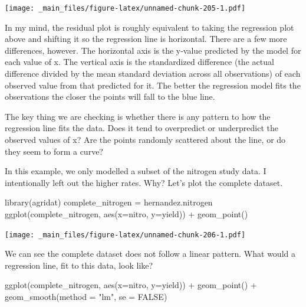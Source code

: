 \documentclass[
]{book}
\newenvironment{Shaded}{\begin{snugshade}}{\end{snugshade}}
\newcommand{\AttributeTok}[1]{\textcolor[rgb]{0.77,0.63,0.00}{#1}}
\newcommand{\ConstantTok}[1]{\textcolor[rgb]{0.00,0.00,0.00}{#1}}
\newcommand{\FunctionTok}[1]{\textcolor[rgb]{0.00,0.00,0.00}{#1}}
\newcommand{\NormalTok}[1]{#1}
\newcommand{\OtherTok}[1]{\textcolor[rgb]{0.56,0.35,0.01}{#1}}
\newcommand{\SpecialCharTok}[1]{\textcolor[rgb]{0.00,0.00,0.00}{#1}}
\newcommand{\StringTok}[1]{\textcolor[rgb]{0.31,0.60,0.02}{#1}}
\begin{document}
\texttt{[image: \_main\_files/figure-latex/unnamed-chunk-205-1.pdf]}

In my mind, the residual plot is roughly equivalent to taking the regression plot above and shifting it so the regression line is horizontal. There are a few more differences, however. The horizontal axis is the y-value predicted by the model for each value of x. The vertical axis is the standardized difference (the actual difference divided by the mean standard deviation across all observations) of each observed value from that predicted for it. The better the regression model fits the observations the closer the points will fall to the blue line.

The key thing we are checking is whether there is any pattern to how the regression line fits the data. Does it tend to overpredict or underpredict the observed values of x? Are the points randomly scattered about the line, or do they seem to form a curve?

In this example, we only modelled a subset of the nitrogen study data. I intentionally left out the higher rates. Why? Let's plot the complete dataset.

\begin{Shaded}
\begin{Highlighting}[]
\FunctionTok{library}\NormalTok{(agridat)}
\NormalTok{complete\_nitrogen }\OtherTok{=}\NormalTok{ hernandez.nitrogen}
\FunctionTok{ggplot}\NormalTok{(complete\_nitrogen, }\FunctionTok{aes}\NormalTok{(}\AttributeTok{x=}\NormalTok{nitro, }\AttributeTok{y=}\NormalTok{yield)) }\SpecialCharTok{+}
  \FunctionTok{geom\_point}\NormalTok{()}
\end{Highlighting}
\end{Shaded}

\texttt{[image: \_main\_files/figure-latex/unnamed-chunk-206-1.pdf]}

We can see the complete dataset does not follow a linear pattern. What would a regression line, fit to this data, look like?

\begin{Shaded}
\begin{Highlighting}[]
\FunctionTok{ggplot}\NormalTok{(complete\_nitrogen, }\FunctionTok{aes}\NormalTok{(}\AttributeTok{x=}\NormalTok{nitro, }\AttributeTok{y=}\NormalTok{yield)) }\SpecialCharTok{+}
  \FunctionTok{geom\_point}\NormalTok{() }\SpecialCharTok{+}
  \FunctionTok{geom\_smooth}\NormalTok{(}\AttributeTok{method =} \StringTok{"lm"}\NormalTok{, }\AttributeTok{se =} \ConstantTok{FALSE}\NormalTok{)}
\end{Highlighting}
\end{Shaded}
\end{document}
